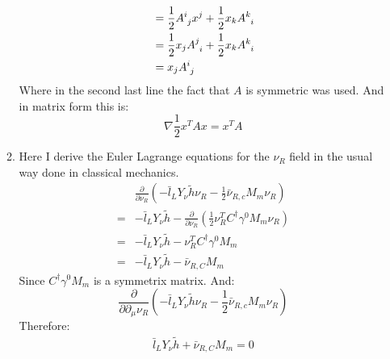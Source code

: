 \documentclass[12pt,a4]{article}
\begin{document}
\begin{enumerate}
\begin{enumerate}
\begin{align*}
                                                                             &= \frac{1}{2} \tensor{A}{^i_j} x^j + \frac{1}{2}  x_k \tensor{A}{^k_i} \\
                                                                             &= \frac{1}{2} x_j \tensor{A}{^j_i}  + \frac{1}{2}  x_k \tensor{A}{^k_i} \\
                                                                             &= x_j\tensor{A}{^i_j} 
        \end{align*}
        Where in the second last line the fact that $A$ is symmetric was used.
        And in matrix form this is:
        \begin{equation*}
          \nabla \frac{1}{2} x^T A x = x^TA
        \end{equation*}
      \item
        Here I derive the Euler Lagrange equations for the $\nu_R$ field in the usual way done in classical mechanics.
        \begin{align*}
           &   \frac{\partial}{\partial \nu_R} \left(-\bar{l}_L Y_\nu \tilde{h}\nu_R - \frac{1}{2} \bar{\nu}_{R, c} M_m \nu_R\right) \\
          =& -\bar{l}_L Y_\nu \tilde{h} - \frac{\partial}{\partial \nu_R} \left( \frac{1}{2} \nu_R^T C^\dagger \gamma^0 M_m \nu_R\right)\\
          =& -\bar{l}_L Y_\nu \tilde{h} - \nu_R^T C^\dagger \gamma^0 M_m\\
          =& -\bar{l}_L Y_\nu \tilde{h} - \bar{\nu}_{R,C} M_m
        \end{align*}
        Since $C^\dagger \gamma^0 M_m$ is a symmetrix matrix.
        And:
        \begin{equation*}
          \frac{\partial}{\partial \partial_\mu{\nu_R}} \left(-\bar{l}_L Y_\nu \tilde{h}\nu_R - \frac{1}{2} \bar{\nu}_{R, c} M_m \nu_R\right)
        \end{equation*}
        Therefore:
        \begin{align*}
           \bar{l}_L Y_\nu \tilde{h} + \bar{\nu}_{R,C} M_m =0
        \end{align*}

\end{enumerate}
\end{enumerate}
\end{document}
